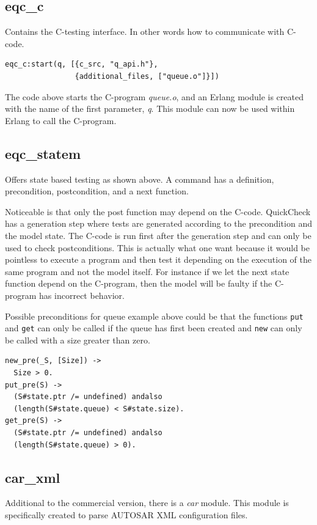 \subsection{eqc\_c} Contains the C-testing interface. In other words how to
communicate with C-code.

\begin{lstlisting}
eqc_c:start(q, [{c_src, "q_api.h"},
                {additional_files, ["queue.o"]}])
\end{lstlisting}
The code above starts the C-program \emph{queue.o}, and an Erlang module is
created with the name of the first parameter, \emph{q}. This module can now
be used within Erlang to call the C-program.

\subsection{eqc\_statem}
\label{SEC:EQC_STATEM}
Offers state based testing as shown above. A command has a definition, precondition,
postcondition, and a next function.

Noticeable is that only the post function may depend on the
C-code. QuickCheck has a generation step where tests are generated
according to the precondition and the model state. The C-code is run
first after the generation step and can only be used to check
postconditions. This is actually what one want because it would be
pointless to execute a program and then test it depending on the
execution of the same program and not the model itself. For instance
if we let the next state function depend on the C-program, then the
model will be faulty if the C-program has incorrect behavior.

Possible preconditions for queue example above could be that the
functions \lstinline!put! and \lstinline!get! can only be called if
the queue has first been created and \lstinline!new! can only be
called with a size greater than zero.
\begin{lstlisting}
new_pre(_S, [Size]) ->
  Size > 0.
put_pre(S) ->
  (S#state.ptr /= undefined) andalso
  (length(S#state.queue) < S#state.size).
get_pre(S) ->
  (S#state.ptr /= undefined) andalso
  (length(S#state.queue) > 0).
\end{lstlisting}

\subsection{car\_xml}
Additional to the commercial version, there is a \emph{car} module. This module is
specifically created to parse AUTOSAR XML configuration files.

